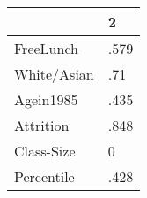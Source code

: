 \begin{table}[htbp]
\begin{tabular}{ll} \hline \hline
 & 2  \\  \hline 
FreeLunch & .579 \\  
White/Asian & .71 \\  
Agein1985 & .435 \\  
Attrition & .848 \\  
Class-Size & 0 \\  
Percentile & .428 \\  
\hline \hline \end{tabular}
\end{table}
